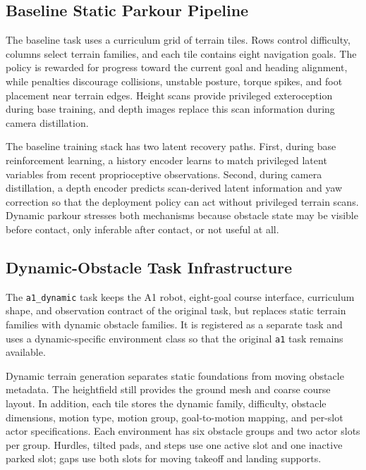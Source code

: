 \documentclass[conference]{IEEEtran}
\begin{document}
\subsection{Baseline Static Parkour Pipeline}
The baseline task uses a curriculum grid of terrain tiles. Rows control difficulty, columns select terrain families, and each tile contains eight navigation goals. The policy is rewarded for progress toward the current goal and heading alignment, while penalties discourage collisions, unstable posture, torque spikes, and foot placement near terrain edges. Height scans provide privileged exteroception during base training, and depth images replace this scan information during camera distillation.


The baseline training stack has two latent recovery paths. First, during base reinforcement learning, a history encoder learns to match privileged latent variables from recent proprioceptive observations. Second, during camera distillation, a depth encoder predicts scan-derived latent information and yaw correction so that the deployment policy can act without privileged terrain scans. Dynamic parkour stresses both mechanisms because obstacle state may be visible before contact, only inferable after contact, or not useful at all.

\subsection{Dynamic-Obstacle Task Infrastructure}
The \texttt{a1\_dynamic} task keeps the A1 robot, eight-goal course interface, curriculum shape, and observation contract of the original task, but replaces static terrain families with dynamic obstacle families. It is registered as a separate task and uses a dynamic-specific environment class so that the original \texttt{a1} task remains available.

Dynamic terrain generation separates static foundations from moving obstacle metadata. The heightfield still provides the ground mesh and coarse course layout. In addition, each tile stores the dynamic family, difficulty, obstacle dimensions, motion type, motion group, goal-to-motion mapping, and per-slot actor specifications. Each environment has six obstacle groups and two actor slots per group. Hurdles, tilted pads, and steps use one active slot and one inactive parked slot; gaps use both slots for moving takeoff and landing supports.
\end{document}
